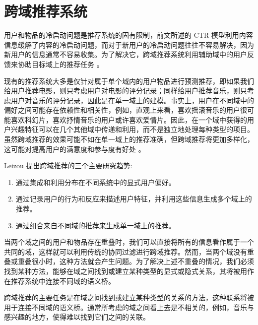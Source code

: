 


\section{跨域推荐系统} %
\label{sec:跨域推荐系统}
用户和物品的冷启动问题是推荐系统的固有限制，前文所述的 CTR 模型利用内容信息缓解了内容的冷启动问题，而对于新用户的冷启动问题往往不容易解决，因为新用户的信息通常不容易收集。为了解决它，跨域推荐系统利用辅助域中的用户反馈来协助目标域上的推荐任务 \cite{Xin2015Cross}。

现有的推荐系统大多是仅针对属于单个域内的用户物品进行预测推荐，即如果我们给用户推荐电影，则只考虑用户对电影的评分记录；同样给用户推荐音乐，则只考虑用户对音乐的评分记录，因此是在单一域上的建模。事实上，用户在不同域中的偏好之间可能存在依赖性和相关性，例如，直观上来看，喜欢摇滚音乐的用户很可能喜欢科幻片，喜欢抒情音乐的用户或许喜欢爱情片。因此，在一个域中获得的用户兴趣特征可以在几个其他域中传递和利用，而不是独立地处理每种类型的项目。虽然跨域推荐的效果可能不如在单一域上的推荐准确，但跨域推荐将更加多样化，这可能对提高用户的满意度和参与度有好处 \cite{fernandez2012cross}。

Leizou \cite{Loizou2009How} 提出跨域推荐的三个主要研究趋势:
\begin{enumerate}[itemindent=1em]
\item 通过集成和利用分布在不同系统中的显式用户偏好。
\item 通过记录用户的行为和反应来描述用户特征，并利用这些信息生成多个域上的推荐。
\item 通过组合来自不同域的推荐来生成单一域上的推荐。
\end{enumerate}

当两个域之间的用户和物品存在重叠时，我们可以直接将所有的信息看作属于一个共同的域，这样就可以利用传统的协同过滤进行跨域推荐。然而，当两个域没有重叠或重叠很小时，这种方法就会产生问题。为了解决上述不重叠的情况，我们必须找到某种方法，能够在域之间找到或建立某种类型的显式或隐式关系，其将被用作在推荐系统中连接不同域的语义桥\cite{fernandez2012cross}。

跨域推荐的主要任务是在域之间找到或建立某种类型的关系的方法，这种联系将被用于连接不同域的语义桥。通常所考虑的域之间看上去是不相关的，例如，音乐与感兴趣的地方，使得难以找到它们之间的关联。

